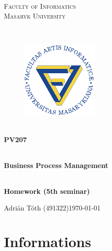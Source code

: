 \documentclass[11pt,a4paper]{article}
\begin{document}
\begin{titlepage}

    \begin{center}
        \vfill {%
            \Huge{%
                \textsc{%
                    Faculty of Informatics\\[3mm]%
                    Masaryk University%
                }%
            }%
        }%

        \hfill\\[15mm]

        \begin{figure}[!h]
            \centering
            \includegraphics[scale=3]{muni-fi-logo.pdf}
        \end{figure}

        \hfill\\[10mm]

        \Huge{
            \textbf{
                PV207
            }
        }

        \hfill\\[-10mm]

        \huge{
            \textbf{
                Business Process Management
            }
        }

        \hfill\\[10mm]

        \LARGE{
            \textbf{
                Homework (5th seminar)
            }
        }
        \vfill

    \end{center}

        \Large{
            \noindent Adrián Tóth (491322)\hfill \today
        }

\end{titlepage}

\setlength{\parskip}{0pt}
    {
        \hypersetup{
            hidelinks=true
        }
        \tableofcontents
    }
\setlength{\parskip}{0pt}

\newpage

\section{Informations}
\end{document}
